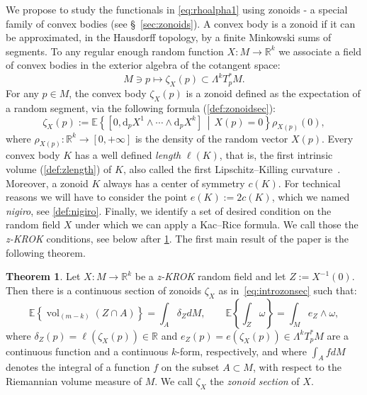 \documentclass[10pt]{amsart}
\theoremstyle{definition}\newtheorem{defi}[theo]{Definition}\newtheorem{rema}[theo]{Remark}\newtheorem{exam}[theo]{Example}\newtheorem{exem}[theo]{Example}\newtheorem{nota}[theo]{Notation}
\newtheorem{mainthm}{Theorem}
\newcommand{\R}{\mathbb{R}}
\newcommand{\EE}{\mathbb{E}}
\newcommand{\dd}{\mathrm{d}}
\DeclareMathOperator{\vol}{vol}
\newcommand{\zkrok}{\emph{z-KROK}\xspace}
\begin{document}
We propose to study the functionals in \eqref{eq:rhoalpha1} using zonoids - a special family of convex bodies (see \S~\ref{sec:zonoids}). A convex body is a zonoid if it can be approximated, in the Hausdorff topology, by a finite Minkowski sums of segments. To any regular enough random function $X\colon M\to \R^k$ we associate a field of convex bodies in the exterior algebra of the cotangent space:
\begin{equation*}
M\ni p\mapsto \zeta_X(p)\subset \Lambda^kT^*_pM.
\end{equation*}
For any $p\in M$, the convex body $\zeta_X(p)$ is a zonoid defined as the expectation of a random segment, via the following formula (\cref{def:zonoidsec}):
\begin{equation}\label{eq:introzonsec}
\zeta_X(p):=\EE\left\{\left[0,\dd_pX^1\wedge\cdots\wedge\dd_p X^k\right]\,\middle|\,X(p)=0\right\}\rho_{X(p)}(0),
\end{equation}
where $\rho_{X(p)}:\R^k\to [0,+\infty]$ is the density of the random vector $X(p)$. Every convex body $K$ has a well defined \emph{length} $\ell(K)$, that is, the first intrinsic volume (\cref{def:zlength}) of $K$, also called the first Lipschitz--Killing curvature~\cite{AdlerTaylor}. Moreover, a zonoid $K$ always has a center of symmetry $c(K)$. For technical reasons we will have to consider the point $e(K):=2c(K)$, which we named \emph{nigiro}, see \cref{def:nigiro}. Finally, we identify a set of desired condition on the random field $X$ under which we can apply a Kac--Rice formula. We call those the \zkrok conditions, see below after \cref{thm:1}. The first main result of the paper is the following theorem.

\begin{mainthm}\label{thm:1}
Let $X\colon M \to \R^k$ be a \zkrok random field and let $Z:=X^{-1}(0)$. Then there is a continuous section of zonoids $\zeta_X$ as in~\eqref{eq:introzonsec} such that:
\begin{equation}\label{eq:rhoalpha}
\EE\left\{\vol_{(m-k)}(Z\cap A)\right\}=\int_A \delta_Z dM, \qquad \EE\left\{\int_{Z} \omega\right\}=\int_M e_Z\wedge \omega,
\end{equation}
where $\delta_Z(p)=\ell(\zeta_X(p))\in \R$ and $e_Z(p)=e(\zeta_X(p))\in \Lambda^kT^*_pM$ are a continuous function and a continuous $k$-form, respectively, and where $\int_AfdM$ denotes the integral of a function $f$ on the subset $A\subset M$, with respect to the Riemannian volume measure of $M$. We call $\zeta_X$ the \emph{zonoid section} of $X$.
\end{mainthm}
\end{document}
